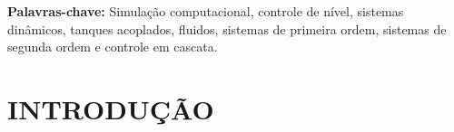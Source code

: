 \documentclass[a4paper,12pt]{article}
\begin{document}
\vspace{1cm}

\textbf{Palavras-chave:} Simulação computacional, controle de nível, sistemas dinâmicos,
tanques acoplados, fluidos, sistemas de primeira ordem, sistemas de segunda ordem e controle em cascata.


\newpage




\begin{center}
\tableofcontents
\end{center}

\newpage


\thispagestyle{main}

\section{INTRODUÇÃO}\hspace{4ex}
\end{document}
